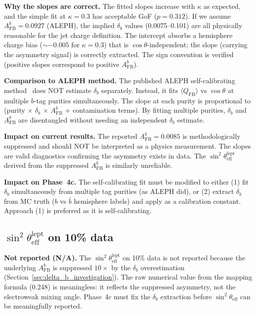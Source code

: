 \documentclass[11pt,a4paper]{article}
\begin{document}
\textbf{Why the slopes are correct.} The fitted slopes increase with $\kappa$ as
expected, and the simple fit at $\kappa = 0.3$ has acceptable GoF ($p = 0.312$).
If we assume $A_\mathrm{FB}^b = 0.0927$ (ALEPH), the implied $\delta_b$ values
(0.0075--0.101) are all physically reasonable for the jet charge definition.
The intercept absorbs a hemisphere charge bias ($\sim -0.005$ for $\kappa = 0.3$)
that is $\cos\theta$-independent; the slope (carrying the asymmetry signal) is
correctly extracted. The sign convention is verified (positive slopes correspond
to positive $A_\mathrm{FB}^b$).

\textbf{Comparison to ALEPH method.} The published ALEPH self-calibrating
method~\cite{ALEPH:AFBb} does NOT estimate $\delta_b$ separately. Instead, it fits
$\langle Q_\mathrm{FB} \rangle$ vs $\cos\theta$ at multiple $b$-tag purities
simultaneously. The slope at each purity is proportional to
(purity $\times$ $\delta_b$ $\times$ $A_\mathrm{FB}^b$ + contamination terms).
By fitting multiple purities, $\delta_b$ and $A_\mathrm{FB}^b$ are disentangled
without needing an independent $\delta_b$ estimate.

\textbf{Impact on current results.} The reported $A_\mathrm{FB}^b = 0.0085$ is
methodologically suppressed and should NOT be interpreted as a physics measurement.
The slopes are valid diagnostics confirming the asymmetry exists in data. The
$\sin^2\theta_\mathrm{eff}^\mathrm{lept}$ derived from the suppressed
$A_\mathrm{FB}^b$ is similarly unreliable.

\textbf{Impact on Phase~4c.} The self-calibrating fit must be modified to either
(1) fit $\delta_b$ simultaneously from multiple tag purities (as ALEPH did), or
(2) extract $\delta_b$ from MC truth ($b$ vs $\bar{b}$ hemisphere labels) and apply
as a calibration constant. Approach (1) is preferred as it is self-calibrating.

\subsection{$\sin^2\theta_\mathrm{eff}^\mathrm{lept}$ on 10\% data}
\label{sec:result_sin2theta_10pct}

\textbf{Not reported (N/A).} The $\sin^2\theta_\mathrm{eff}^\mathrm{lept}$ on 10\%
data is not reported because the underlying $A_\mathrm{FB}^b$ is suppressed $10\times$
by the $\delta_b$ overestimation (Section~\ref{sec:delta_b_investigation}).
The raw numerical value from the mapping formula (0.248) is meaningless: it reflects
the suppressed asymmetry, not the electroweak mixing angle.
Phase~4c must fix the $\delta_b$ extraction
before $\sin^2\theta_\mathrm{eff}$ can be meaningfully reported.
\end{document}
